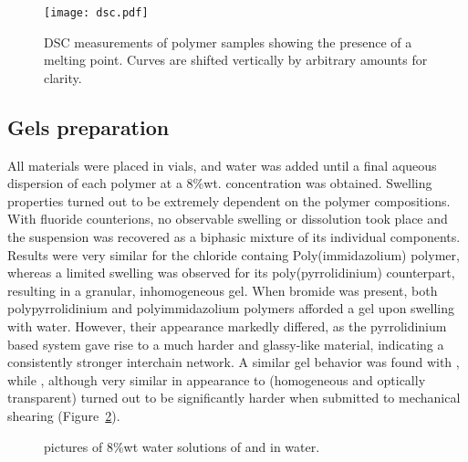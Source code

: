 \documentclass[journal=jacsat,manuscript=article]{achemso}
\begin{document}
\begin{figure}
\texttt{[image: dsc.pdf]}
\caption{DSC measurements of polymer samples showing the presence of a melting point. Curves are shifted vertically by arbitrary amounts for clarity.}
\label{fig:dsc}
\end{figure}

\subsection{Gels preparation}
All materials were placed in vials, and water was added until a final aqueous dispersion of each polymer at a 8\%wt. concentration was obtained. Swelling properties turned out to be extremely dependent on the polymer compositions. With fluoride counterions, no observable swelling or dissolution took place and the suspension was recovered as a biphasic mixture of its individual components. Results were very similar for the chloride containg Poly(immidazolium) polymer, whereas a limited swelling was observed for its poly(pyrrolidinium) counterpart, resulting in a granular, inhomogeneous gel. When bromide was present, both polypyrrolidinium and polyimmidazolium polymers afforded a gel upon swelling with water. However, their appearance markedly differed, as the pyrrolidinium based system gave rise to a much harder and glassy-like material, indicating a consistently stronger interchain network. A similar gel behavior was found with , while , although very similar in appearance to  (homogeneous and optically transparent) turned out to be significantly harder when submitted to mechanical shearing (Figure~\ref{fig:pictures}).

\begin{figure}
\caption{pictures of 8\%wt water solutions of  and  in water.}
\label{fig:pictures}
\end{figure}
\end{document}
